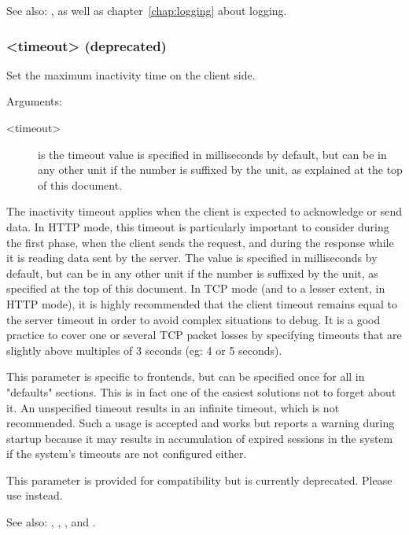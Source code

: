   See also: ,  as well as chapter~\ref{chap:logging}
             about logging.

\subsubsection[clitimeout]{ <timeout> (deprecated)}

  Set the maximum inactivity time on the client side.
  
  
  Arguments:
  \begin{description}
  \item[<timeout>] is the timeout value is specified in milliseconds by default, but
              can be in any other unit if the number is suffixed by the unit,
              as explained at the top of this document.  
  \end{description}

  The inactivity timeout applies when the client is expected to acknowledge or
  send data. In HTTP mode, this timeout is particularly important to consider
  during the first phase, when the client sends the request, and during the
  response while it is reading data sent by the server. The value is specified
  in milliseconds by default, but can be in any other unit if the number is
  suffixed by the unit, as specified at the top of this document. In TCP mode
  (and to a lesser extent, in HTTP mode), it is highly recommended that the
  client timeout remains equal to the server timeout in order to avoid complex
  situations to debug. It is a good practice to cover one or several TCP packet
  losses by specifying timeouts that are slightly above multiples of 3 seconds
  (eg: 4 or 5 seconds).

  This parameter is specific to frontends, but can be specified once for all in
  "defaults" sections. This is in fact one of the easiest solutions not to
  forget about it. An unspecified timeout results in an infinite timeout, which
  is not recommended. Such a usage is accepted and works but reports a warning
  during startup because it may results in accumulation of expired sessions in
  the system if the system's timeouts are not configured either.

  This parameter is provided for compatibility but is currently deprecated.
  Please use  instead.

  See also: , , , and
            .

